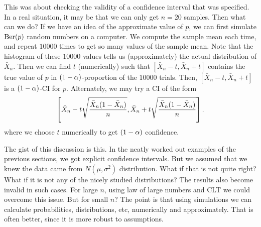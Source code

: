 \documentclass[preprint,  11pt]{amsart}
\def\sig{{\sigma}}
\begin{document}
This was about checking the validity of a confidence interval that was specified. In a real situation, it may be that we can only get $n=20$ samples. Then what can we do? If we have an idea of the approximate value of $p$, we can first simulate $\mbox{Ber}(p)$ random numbers on a computer. We compute the sample mean each time, and repeat  $10000$ times to get so many values of the sample mean. Note that the histogram of these $10000$ values tells us (approximately) the actual distribution of $\bar{X}_{n}$. Then we can find $t$ (numerically) such that $[\bar{X}_{n}-t,\bar{X}_{n}+t]$ contains the true value of $p$ in $(1-\alpha)$-proportion of the $10000$ trials. Then, $[\bar{X}_{n}-t,\bar{X}_{n}+t]$ is a $(1-\alpha)$-CI for $p$. Alternately, we may try a CI of the form $$
\left[\bar{X}_{n}-t\sqrt{\frac{\bar{X}_{n}(1-\bar{X}_{n})}{n}}, \bar{X}_{n}+t\sqrt{\frac{\bar{X}_{n}(1-\bar{X}_{n})}{n}}\right].
$$
where we choose $t$ numerically to get $(1-\alpha)$ confidence.

 The gist of this discussion is this. In the neatly worked out examples of the previous sections, we got explicit confidence intervals. But we assumed that we knew the data came from $N(\mu,\sig^{2})$ distribution. What if that is not quite right? What if it is not any of the nicely studied distributions? The results also become invalid in such cases. For large $n$, using law of large numbers and CLT we could overcome this issue. But for small $n$? The point is that using simulations we can calculate probabilities, distributions, etc, numerically and approximately. That is often better, since it is more robust to assumptions.


\end{document}
